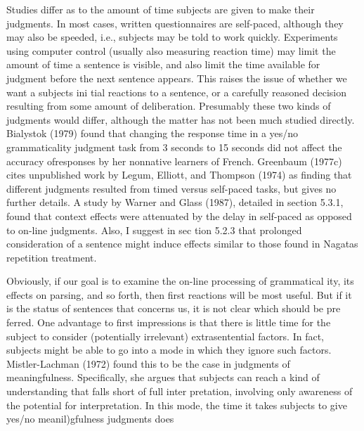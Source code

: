 \begin{styleTextbody}
Studies differ as to the amount of time subjects are given to make their judgments. In most cases, written questionnaires are self-paced, although they may also be speeded, i.e., subjects may be told to work quickly. Experiments using computer control (usually also measuring reaction time) may limit the amount of time a sentence is visible, and also limit the time available for judgment before the next sentence appears. This raises the issue of whether we want a subject{\textquotesingle}s ini\- tial reactions to a sentence, or a carefully reasoned decision resulting from some amount of deliberation. Presumably these two kinds of judgments would differ, although the matter has not been much studied directly. Bialystok (1979) found that changing the response time in a yes/no grammaticality judgment task from 3 seconds to 15 seconds did not affect the accuracy ofresponses by her nonnative learners of French. Greenbaum (1977c) cites unpublished work by Legum, Elliott, and Thompson (1974) as finding that different judgments resulted from timed versus self-paced tasks, but gives no further details. A study by Warner and Glass (1987), detailed in section 5.3.1, found that context effects were attenuated by the delay in self-paced as opposed to on-line judgments. Also, I suggest in sec\- tion 5.2.3 that prolonged consideration of a sentence might induce effects similar to those found in Nagata{\textquotesingle}s repetition treatment.
\end{styleTextbody}


\begin{styleTextbody}
Obviously, if our goal is to examine the on-line processing of grammatical\- ity, its effects on parsing, and so forth, then first reactions will be most useful. But if it is the status of sentences that concerns us, it is not clear which should be pre\- ferred. One advantage to first impressions is that there is little time for the subject to consider (potentially irrelevant) extrasentential factors. In fact, subjects might be able to go into a mode in which they ignore such factors. Mistler-Lachman (1972) found this to be the case in judgments of meaningfulness. Specifically, she argues that subjects can reach a kind of understanding that falls short of full inter\- pretation, involving only {\textquotedbl}awareness of the potential for interpretation.{\textquotedbl} In this mode, the time it takes subjects to give yes/no meanil)gfulness judgments does
\end{styleTextbody}


